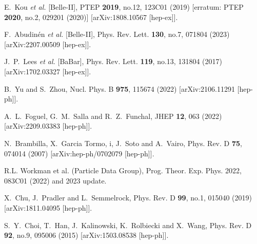 \documentclass[14pt]{article}
\begin{document}
{\begin{thebibliography}{99}
E.~Kou \textit{et al.} [Belle-II],
PTEP \textbf{2019}, no.12, 123C01 (2019)
[erratum: PTEP \textbf{2020}, no.2, 029201 (2020)]
[arXiv:1808.10567 [hep-ex]].

F.~Abudin\'en \textit{et al.} [Belle-II],
Phys. Rev. Lett. \textbf{130}, no.7, 071804 (2023)
[arXiv:2207.00509 [hep-ex]].


J.~P.~Lees \textit{et al.} [BaBar],
Phys. Rev. Lett. \textbf{119}, no.13, 131804 (2017)
[arXiv:1702.03327 [hep-ex]].


B.~Yu and S.~Zhou,
Nucl. Phys. B \textbf{975}, 115674 (2022)
[arXiv:2106.11291 [hep-ph]].

A.~L.~Foguel, G.~M.~Salla and R.~Z.~Funchal,
JHEP \textbf{12}, 063 (2022)
[arXiv:2209.03383 [hep-ph]].

N.~Brambilla, X.~Garcia Tormo, i, J.~Soto and A.~Vairo,
Phys. Rev. D \textbf{75}, 074014 (2007)
[arXiv:hep-ph/0702079 [hep-ph]].

R.L. Workman et al. (Particle Data Group), Prog. Theor. Exp. Phys. 2022, 083C01 (2022)  and 2023 update.

X.~Chu, J.~Pradler and L.~Semmelrock,
Phys. Rev. D \textbf{99}, no.1, 015040 (2019)
[arXiv:1811.04095 [hep-ph]].

S.~Y.~Choi, T.~Han, J.~Kalinowski, K.~Rolbiecki and X.~Wang,
Phys. Rev. D \textbf{92}, no.9, 095006 (2015)
[arXiv:1503.08538 [hep-ph]].



\end{thebibliography}}
\end{document}
